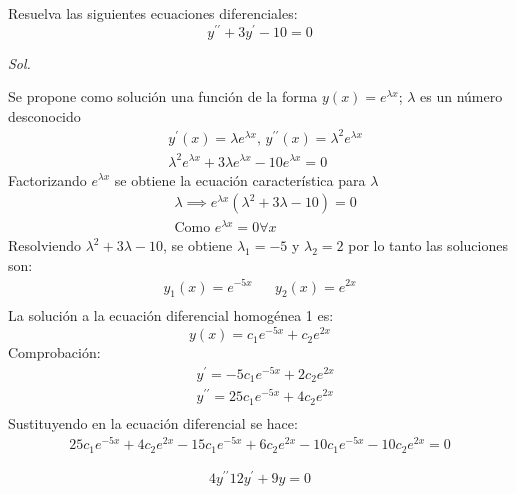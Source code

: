 \begin{example}
    Resuelva las siguientes ecuaciones diferenciales:
    \begin{equation*}
        y^{\prime\prime} + 3y^{\prime} - 10 =0
    \end{equation*}
\end{example}

\textit{ Sol. }

Se propone como solución una función de la forma $y(x)=e^{\lambda x}$; $\lambda$ es un número desconocido
\begin{align*}
    &y^{\prime}(x) = \lambda e^{\lambda x},\, y^{\prime\prime}(x) =\lambda^2e^{\lambda x}\\
    &\lambda^2 e^{\lambda x} + 3\lambda e^{\lambda x} - 10e^{\lambda x}= 0
\end{align*}
Factorizando $e^{\lambda x}$ se obtiene la ecuación característica para $\lambda$
\begin{align*}
    &\lambda \implies e^{\lambda x}\left(\lambda^2 + 3\lambda -10\right) = 0\\
    &\text{Como }e^{\lambda x} = 0\forall x
\end{align*}
Resolviendo $\lambda^2 + 3\lambda -10$, se obtiene $\lambda_1=-5$ y $\lambda_2=2$ por lo tanto las soluciones son:
\begin{align*}
    y_1(x) = e^{- 5x}&& y_2(x) = e^{2x}\\
\end{align*}
La solución a la ecuación diferencial homogénea 1 es:
\begin{equation}
    y(x) =c_1e^{ - 5x} +c_2e^{2x}
\end{equation}
Comprobación:
\begin{align*}
    &y^{\prime} =- 5c_1e^{ - 5x} + 2c_2e^{2x}\\
    &y^{\prime\prime} = 25c_1e^{ -5x} + 4c_2e^{2x}\\
\end{align*}
Sustituyendo en la ecuación diferencial se hace:
\begin{align*}
    25c_1e^{ -5x} + 4c_2e^{2x} - 15c_1e^{ -5x} + 6c_2e^{2x} -10c_1e^{ -5x} - 10c_2e^{2x} = 0
\end{align*}

\begin{example}
    \begin{equation*}
        4y^{\prime\prime} 12y^{\prime} + 9y = 0
    \end{equation*}
\end{example}

